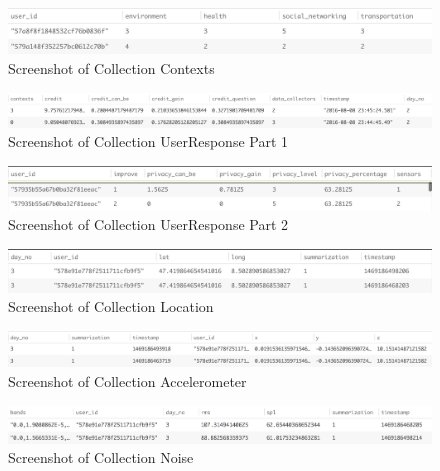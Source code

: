 \begin{figure}[ht!]
\centering
\includegraphics[width=\textwidth,keepaspectratio]{./images/collection_context_cat}
\caption{Screenshot of Collection Contexts}
\label{fig:col_c}
\end{figure}

\begin{figure}[ht!]
\centering
\includegraphics[width=\textwidth,keepaspectratio]{./images/collection_ur_1}
\caption{Screenshot of Collection UserResponse Part 1}
\label{fig:col_ur_1}
\end{figure}

\begin{figure}[ht!]
\centering
\includegraphics[width=\textwidth,keepaspectratio]{./images/collection_ur_2}
\caption{Screenshot of Collection UserResponse Part 2}
\label{fig:col_ur_2}
\end{figure}

\begin{figure}[ht!]
\centering
\includegraphics[width=\textwidth,keepaspectratio]{./images/collection_loc}
\caption{Screenshot of Collection Location}
\label{fig:col_loc}
\end{figure}

\begin{figure}[ht!]
\centering
\includegraphics[width=\textwidth,keepaspectratio]{./images/collection_acc}
\caption{Screenshot of Collection Accelerometer}
\label{fig:col_acc}
\end{figure}

\begin{figure}[ht!]
\centering
\includegraphics[width=\textwidth,keepaspectratio]{./images/collection_noise}
\caption{Screenshot of Collection Noise}
\label{fig:col_noise}
\end{figure}

